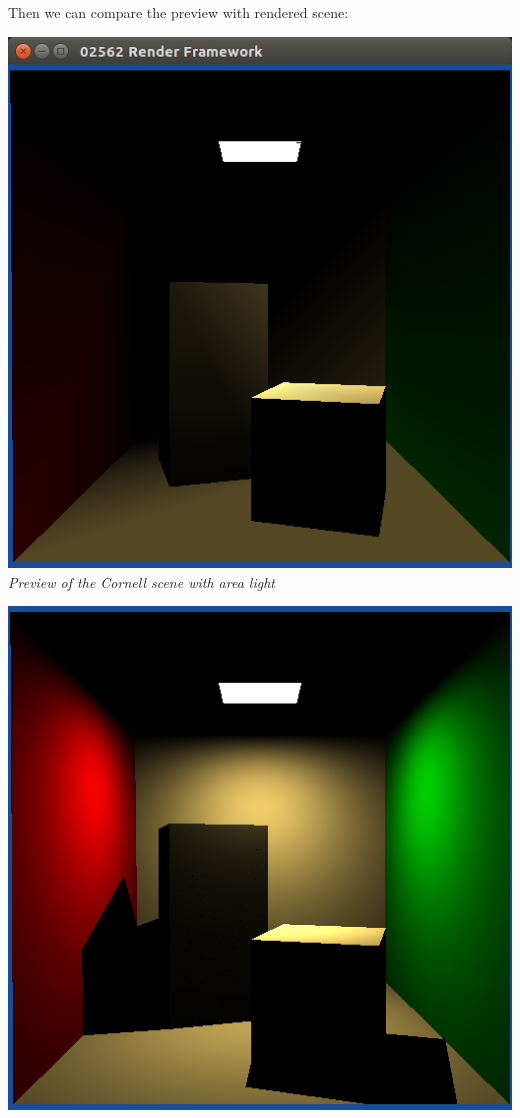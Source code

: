 \documentclass[a4,12pt]{article}
\begin{document}
	
	Then we can compare the preview with rendered scene:
	\begin{center}
		\begin{minipage}[b]{0.40\linewidth}
			\begin{center}
				\includegraphics[width = \textwidth]{./Worksheet4/preview_cornell_area.png}\\
				\textit{Preview of the Cornell scene with area light}
			\end{center}
		\end{minipage}
		\hspace{0.05\linewidth}
		\begin{minipage}[b]{0.40\linewidth}
			\begin{center}
				\includegraphics[width =\textwidth]{./Worksheet4/cornellblocks_render.png}\\

\end{center}
\end{minipage}
\end{center}
\end{document}
